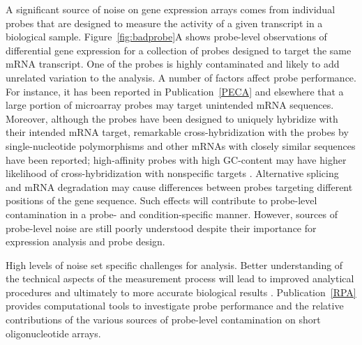 A significant source of noise on gene expression arrays comes from
individual probes that are designed to measure the activity of a given
transcript in a biological sample. Figure~\ref{fig:badprobe}A
shows probe-level observations of differential gene expression for a
collection of probes designed to target the same mRNA transcript. One
of the probes is highly contaminated and likely to add unrelated
variation to the analysis. A number of factors affect probe
performance.  For instance, it has been reported in
Publication~\ref{PECA} and elsewhere \citep{Hwang04,Mecham04b} that a
large portion of microarray probes may target unintended mRNA
sequences. Moreover, although the probes have been designed to
uniquely hybridize with their intended mRNA target, remarkable
cross-hybridization with the probes by single-nucleotide polymorphisms
\citep{Dai05, Sliwerska07} and other mRNAs with closely similar
sequences \citep{Zhang05} have been reported; high-affinity probes
with high GC-content may have higher likelihood of cross-hybridization
with nonspecific targets \citep{Mei03}.  Alternative splicing
\citep{Shi06} and mRNA degradation \citep{Auer03} may cause
differences between probes targeting different positions of the gene
sequence. Such effects will contribute to probe-level contamination in
a probe- and condition-specific manner. However, sources of
probe-level noise are still poorly understood \citep{Irizarry05,Li05}
despite their importance for expression analysis and probe design.

High levels of noise set specific challenges for analysis. Better
understanding of the technical aspects of the measurement process will
lead to improved analytical procedures and ultimately to more
accurate biological results \citep{Reimers2010}. Publication~\ref{RPA}
provides computational tools to investigate probe performance and the
relative contributions of the various sources of probe-level
contamination on short oligonucleotide arrays.

